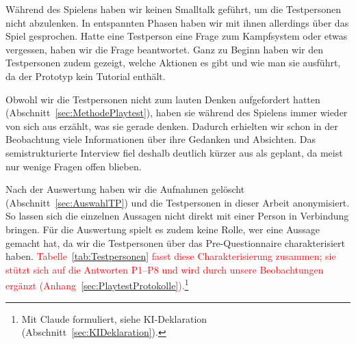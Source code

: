 \documentclass[../Main.tex]{subfiles}
\begin{document}
Während des Spielens haben wir keinen Smalltalk geführt, um die Testpersonen nicht abzulenken. In entspannten Phasen haben wir mit ihnen allerdings über das Spiel gesprochen. Hatte eine Testperson eine Frage zum Kampfsystem oder etwas vergessen, haben wir die Frage beantwortet. Ganz zu Beginn haben wir den Testpersonen zudem gezeigt, welche Aktionen es gibt und wie man sie ausführt, da der Prototyp kein Tutorial enthält.

Obwohl wir die Testpersonen nicht zum lauten Denken aufgefordert hatten (Abschnitt~\ref{sec:MethodePlaytest}), haben sie während des Spielens immer wieder von sich aus erzählt, was sie gerade denken. Dadurch erhielten wir schon in der Beobachtung viele Informationen über ihre Gedanken und Absichten. Das semistrukturierte Interview fiel deshalb deutlich kürzer aus als geplant, da meist nur wenige Fragen offen blieben.

Nach der Auswertung haben wir die Aufnahmen gelöscht (Abschnitt~\ref{sec:AuswahlTP}) und die Testpersonen in dieser Arbeit anonymisiert. So lassen sich die einzelnen Aussagen nicht direkt mit einer Person in Verbindung bringen. Für die Auswertung spielt es zudem keine Rolle, wer eine Aussage gemacht hat, da wir die Testpersonen über das Pre-Questionnaire charakterisiert haben. \textcolor{red}{Tabelle~\ref{tab:Testpersonen} fasst diese Charakterisierung zusammen; sie stützt sich auf die Antworten P1--P8 und wird durch unsere Beobachtungen ergänzt (Anhang~\ref{sec:PlaytestProtokolle}).\footnote{Mit Claude formuliert, siehe KI-Deklaration (Abschnitt~\ref{sec:KIDeklaration}).}}
\end{document}
